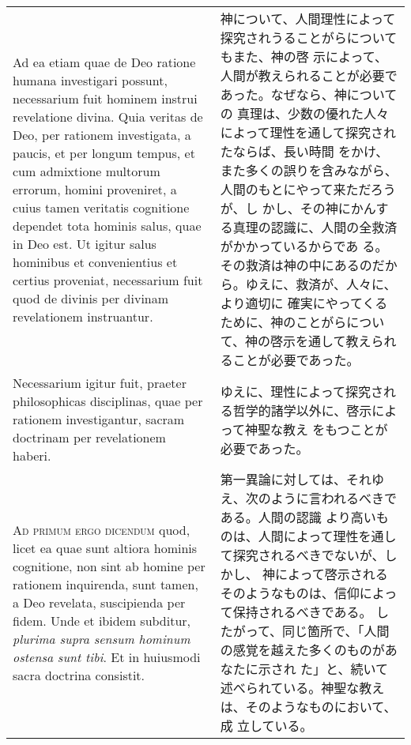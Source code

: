 \documentclass[10pt]{jsarticle}
\begin{document}
\begin{longtable}{p{21em}p{21em}}
\\

Ad ea etiam quae de Deo ratione humana investigari possunt,
necessarium fuit hominem instrui revelatione divina. Quia veritas de
Deo, per rationem investigata, a paucis, et per longum tempus, et cum
admixtione multorum errorum, homini proveniret, a cuius tamen
veritatis cognitione dependet tota hominis salus, quae in Deo est. Ut
igitur salus hominibus et convenientius et certius proveniat,
necessarium fuit quod de divinis per divinam revelationem instruantur.


&

神について、人間理性によって探究されうることがらについてもまた、神の啓
示によって、人間が教えられることが必要であった。なぜなら、神についての
真理は、少数の優れた人々によって理性を通して探究されたならば、長い時間
をかけ、また多くの誤りを含みながら、人間のもとにやって来ただろうが、し
かし、その神にかんする真理の認識に、人間の全救済がかかっているからであ
る。その救済は神の中にあるのだから。ゆえに、救済が、人々に、より適切に
確実にやってくるために、神のことがらについて、神の啓示を通して教えられ
ることが必要であった。


\\




Necessarium igitur fuit, praeter philosophicas disciplinas,
quae per rationem investigantur, sacram doctrinam per revelationem
haberi.

&

ゆえに、理性によって探究される哲学的諸学以外に、啓示によって神聖な教え
をもつことが必要であった。


\\



{\scshape Ad primum ergo dicendum} quod, licet ea quae sunt altiora
hominis cognitione, non sint ab homine per rationem inquirenda, sunt
tamen, a Deo revelata, suscipienda per fidem. Unde et ibidem subditur,
{\itshape plurima supra sensum hominum ostensa sunt tibi}. Et in
huiusmodi sacra doctrina consistit.

&

第一異論に対しては、それゆえ、次のように言われるべきである。人間の認識
より高いものは、人間によって理性を通して探究されるべきでないが、しかし、
神によって啓示されるそのようなものは、信仰によって保持されるべきである。
したがって、同じ箇所で、「人間の感覚を越えた多くのものがあなたに示され
た」と、続いて述べられている。神聖な教えは、そのようなものにおいて、成
立している。


\end{longtable}
\end{document}
